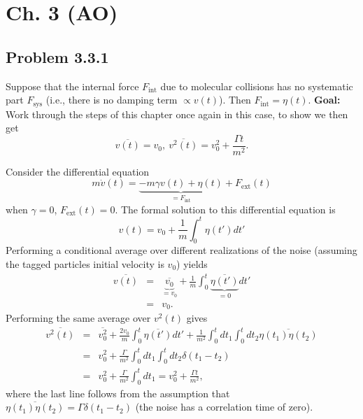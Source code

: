 \section{Ch. 3 (AO)}
\subsection{Problem 3.3.1}

Suppose that the internal force $F_\text{int}$ due to molecular collisions has no systematic part $F_\text{sys}$ (i.e., there is no damping term $\propto v(t)$). Then $F_\text{int}=\eta(t)$. \textbf{Goal:} Work through the steps of this chapter once again in this case, to show we then get
\begin{equation}
\overline{v(t)} = v_0,~\overline{v^2(t)} = v_0^2 + \frac{\Gamma t}{m^2}.
\end{equation}

Consider the differential equation
\begin{equation}
m \dot{v}(t) = \underbrace{-m \gamma v(t) + \eta(t)}_{=F_\text{int}} + F_\text{ext}(t)
\end{equation}
when $\gamma=0$, $F_\text{ext}(t)=0$. The formal solution to this differential equation is
\begin{equation}
v(t) = v_0 + \frac{1}{m} \int_{0}^{t} \eta(t') dt'
\end{equation}
Performing a conditional average over different realizations of the noise (assuming the tagged particles initial velocity is $v_0$) yields
\begin{eqnarray}
\overline{v(t)}&=& \underbrace{\overline{v_0}}_{=v_0} + \frac{1}{m} \int_{0}^{t} \underbrace{\overline{\eta(t')}}_{=0} dt' \\
&=& v_0.
\end{eqnarray}
Performing the same average over $v^2(t)$ gives
\begin{eqnarray}
\overline{v^2(t)}&=& \overline{v_0^2} + \frac{2 v_0 }{m} \int_{0}^{t} \overline{\eta(t')} dt' + \frac{1}{m^2} \int_{0}^{t} dt_1 \int_{0}^{t} dt_2 \overline{\eta(t_1) \eta(t_2)}  \\
&=& v_0^2 + \frac{\Gamma}{m^2} \int_{0}^{t} dt_1 \int_{0}^{t} dt_2 \delta(t_1-t_2) \\
&=& \boxed{v_0^2 + \frac{\Gamma}{m^2} \int_{0}^{t} dt_1 = v_0^2 + \frac{\Gamma t}{m^2}},
\end{eqnarray}
where the last line follows from the assumption that $\overline{\eta(t_1) \eta(t_2)}=\Gamma \delta(t_1-t_2)$ (the noise has a correlation time of zero).

